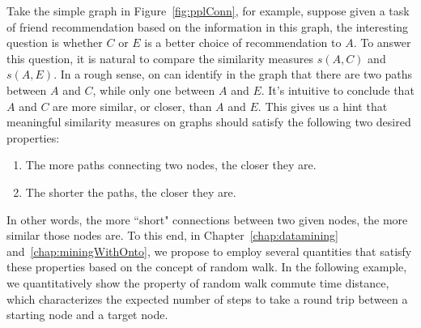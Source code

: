 Take the simple graph in Figure~\ref{fig:pplConn}, for example, suppose given a task of friend recommendation based on the information in this graph, the interesting question is whether $C$ or $E$ is a better choice of recommendation to $A$. To answer this question, it is natural to compare the similarity measures $s(A, C)$ and $s(A, E)$. In a rough sense, on can identify in the graph that there are two paths between $A$ and $C$, while only one between $A$ and $E$. It's intuitive to conclude that $A$ and $C$ are more similar, or closer, than $A$ and $E$. This gives us a hint that meaningful similarity measures on graphs should satisfy the following two desired properties:
\begin{enumerate}
\item The more paths connecting two nodes, the closer they are.
\item The shorter the paths, the closer they are.
\end{enumerate}
In other words, the more ``short" connections between two given nodes, the more similar those nodes are.
To this end, in Chapter~\ref{chap:datamining} and~\ref{chap:miningWithOnto}, we propose to employ several quantities that satisfy these properties based on the concept of random walk. In the following example, we quantitatively show the property of random walk commute time distance, which characterizes the expected number of steps to take a round trip between a starting node and a target node.

